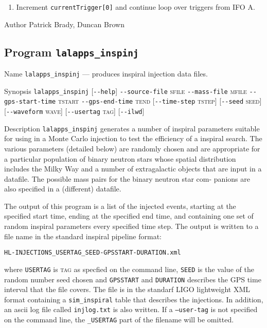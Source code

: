 \begin{entry}
\begin{enumerate}
\begin{enumerate}
\item Increment \texttt{currentTrigger[0]} and continue loop over triggers
from IFO A.
\end{enumerate}
\end{enumerate}

\item[Author] 
Patrick Brady, Duncan Brown
\end{entry}

\clearpage
\subsection{Program \texttt{lalapps\_inspinj}}
\label{program:lalapps-inspinj}

\begin{entry}
\item[Name]
\verb$lalapps_inspinj$ --- produces inspiral injection data files.

\item[Synopsis]
\verb$lalapps_inspinj$ 
[\verb$--help$]
\verb$--source-file$ \textsc{sfile}
\verb$--mass-file$ \textsc{mfile}
\verb$--gps-start-time$ \textsc{tstart} 
\verb$--gps-end-time$ \textsc{tend} 
[\verb$--time-step$ \textsc{tstep}]
[\verb$--seed$ \textsc{seed}]
[\verb$--waveform$ \textsc{wave}]
[\verb$--usertag$ \textsc{tag}]
[\verb$--ilwd$]

\item[Description] 
\verb$lalapps_inspinj$
generates a number of inspiral  parameters suitable  for using in a Monte
Carlo injection to test the efficiency of a inspiral search.  The  various
parameters (detailed  below)  are randomly chosen and are appropriate for a
particular population of binary neutron stars  whose spatial  distribution
includes the Milky Way and a number of extragalactic objects that are  input
in  a  datafile.  The  possible  mass pairs for the binary neutron star com-
panions are also specified in a (different) datafile.

The output of this program  is  a  list  of  the  injected events,  starting
at  the specified start time, ending at the specified end time, and containing
one set  of  random inspiral parameters every specified time step.  The output
is written to a file name in the standard inspiral pipeline format:
\begin{center}
\begin{verbatim}
HL-INJECTIONS_USERTAG_SEED-GPSSTART-DURATION.xml
\end{verbatim}
\end{center}
where \verb$USERTAG$ is \textsc{tag} as specfied on the command line, 
\verb$SEED$ is the  value  of  the random number seed chosen and 
\verb$GPSSTART$ and \verb$DURATION$ describes the GPS time interval that
the file covers. The file is in the standarf LIGO lightweight XML format
containing a \texttt{sim\_inspiral} table that describes the injections.
In addition, an ascii log file called \verb$injlog.txt$ is also written.
If a \texttt{--user-tag} is not specified on the command line, the
\texttt{\_USERTAG} part of the filename will be omitted.


\end{entry}
